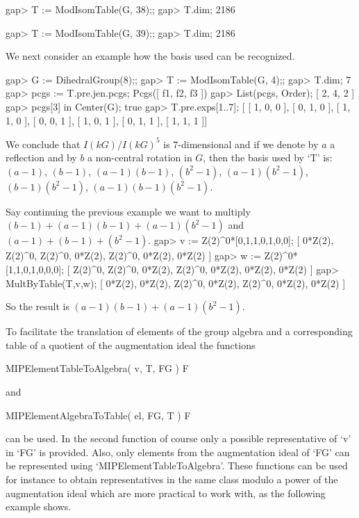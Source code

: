 gap> T := ModIsomTable(G, 38);;
gap> T.dim;
2186

gap> T := ModIsomTable(G, 39);;
gap> T.dim;
2186
\endexample

We next consider an example how the basis used can be recognized.

\beginexample
gap> G := DihedralGroup(8);;
gap> T := ModIsomTable(G, 4);;
gap> T.dim;
7
gap> pcgs := T.pre.jen.pcgs;
Pcgs([ f1, f2, f3 ])
gap> List(pcgs, Order);
[ 2, 4, 2 ]
gap> pcgs[3] in Center(G);
true
gap> T.pre.exps{[1..7]};
[ [ 1, 0, 0 ], [ 0, 1, 0 ], [ 1, 1, 0 ], [ 0, 0, 1 ], [ 1, 0, 1 ], [ 0, 1, 1 ], 
  [ 1, 1, 1 ]] 
\endexample

We conclude that $I(kG)/I(kG)^5$ is $7$-dimensional and if we denote by
  $a$ a reflection and by $b$ a non-central rotation in $G$, then the
  basis used by `T' is: $(a-1)$, $(b-1)$, $(a-1)(b-1)$, $(b^2-1)$,
   $(a-1)(b^2-1)$, $(b-1)(b^2-1)$, $(a-1)(b-1)(b^2-1)$.    
\medskip

 Say continuing the previous example we want to multiply $(b-1)+(a-1)(b-1)+(a-1)(b^2-1)$ and $(a-1)+(b-1)+(b^2-1)$.
\beginexample
gap> v := Z(2)^0*[0,1,1,0,1,0,0];
[ 0*Z(2), Z(2)^0, Z(2)^0, 0*Z(2), Z(2)^0, 0*Z(2), 0*Z(2) ]
gap> w := Z(2)^0*[1,1,0,1,0,0,0];
[ Z(2)^0, Z(2)^0, 0*Z(2), Z(2)^0, 0*Z(2), 0*Z(2), 0*Z(2) ]
gap> MultByTable(T,v,w);
[ 0*Z(2), 0*Z(2), Z(2)^0, 0*Z(2), Z(2)^0, 0*Z(2), 0*Z(2) ]
\endexample

So the result is $(a-1)(b-1) + (a-1)(b^2-1)$.
\medskip

To facilitate the translation of elements of the group algebra
and a corresponding table of a quotient of the augmentation ideal 
the functions

\> MIPElementTableToAlgebra( v, T, FG ) F

and

\> MIPElementAlgebraToTable( el, FG, T ) F 

can be used. In the second function of course only a possible
representative of `v' in `FG' is provided. Also, only elements 
from the augmentation ideal of `FG' can be represented using
`MIPElementTableToAlgebra'. These functions can be used for 
instance to obtain representatives in the same class modulo
a power of the augmentation ideal which are more practical to
work with, as the following example shows.


